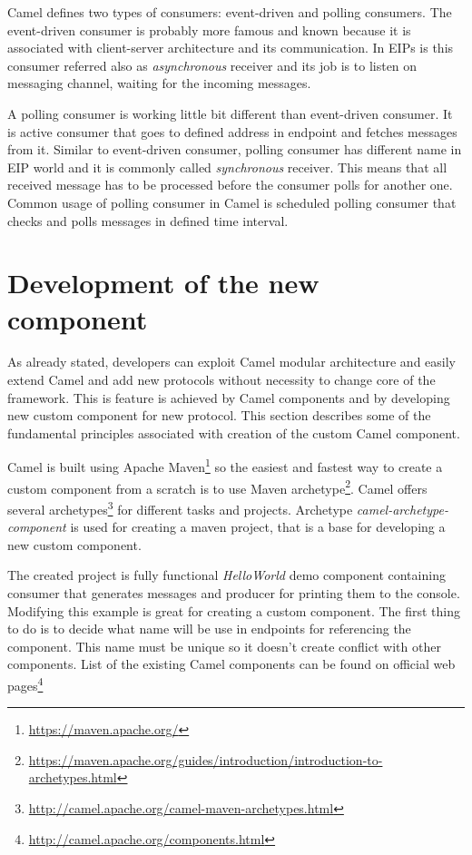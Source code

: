 \documentclass[12pt,final,oneside]{fithesis2}
\begin{document}
Camel defines two types of consumers: event-driven and polling consumers. The event-driven consumer is probably more famous and known because it is associated with client-server architecture and its communication. In EIPs is this consumer referred also as \textit{asynchronous} receiver and its job is to listen on messaging channel, waiting for the incoming messages.

A polling consumer is working little bit different than event-driven consumer. It is active consumer that goes to defined address in endpoint and fetches messages from it. Similar to event-driven consumer, polling consumer has different name in EIP world and it is commonly called \textit{synchronous} receiver. This means that all received message has to be processed before the consumer polls for another one. Common usage of polling consumer in Camel is scheduled polling consumer that checks and polls messages in defined time interval.


 
\section{Development of the new component}\label{component-devel}
As already stated, developers can exploit Camel modular architecture and easily extend Camel and add new protocols without necessity to change core of the framework. This is feature is achieved by Camel components and by developing new custom component for new protocol. This section describes some of the fundamental principles associated with creation of the custom Camel component.

Camel is built using Apache Maven\footnote{\url{https://maven.apache.org/}} so the easiest and fastest way to create a custom component from a scratch is to use Maven archetype\footnote{\url{https://maven.apache.org/guides/introduction/introduction-to-archetypes.html}}. Camel offers several archetypes\footnote{\url{http://camel.apache.org/camel-maven-archetypes.html}} for different tasks and projects. Archetype \textit{camel-archetype-component} is used for creating a maven project, that is a base for developing a new custom component\cite{camel-comp}. 

The created project is fully functional \textit{HelloWorld} demo component containing consumer that generates messages and producer for printing them to the console. Modifying this example is great for creating a custom component. The first thing to do is to decide what name will be use in endpoints for referencing the component. This name must be unique so it doesn't create conflict with other components. List of the existing Camel components can be found on official web pages\footnote{\url{http://camel.apache.org/components.html}}
\end{document}
